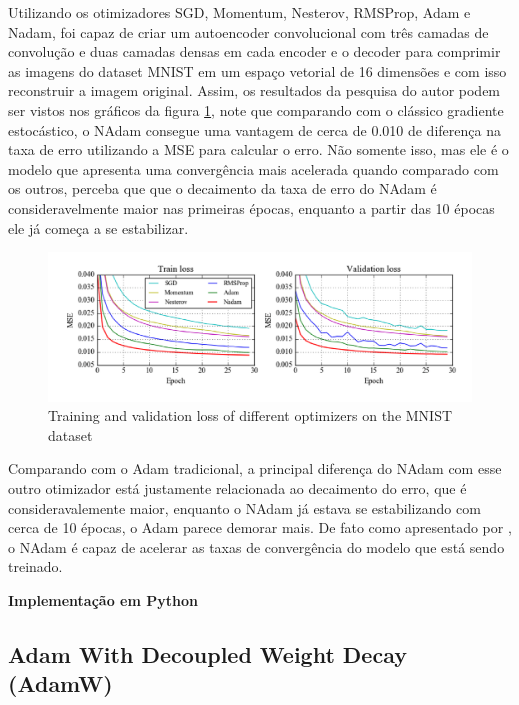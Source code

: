 Utilizando os otimizadores SGD, Momentum, Nesterov, RMSProp, Adam e Nadam, \textcite{NadamMethod} foi capaz de criar um autoencoder convolucional com três camadas de convolução e duas camadas densas em cada encoder e o decoder para comprimir as imagens do dataset MNIST em um espaço vetorial de 16 dimensões e com isso reconstruir a imagem original. Assim, os resultados da pesquisa do autor podem ser vistos nos gráficos da figura \ref{fig:comparativo-nadam-mnist}, note que comparando com o clássico gradiente estocástico, o NAdam consegue uma vantagem de cerca de 0.010 de diferença na taxa de erro utilizando a MSE para calcular o erro. Não somente isso, mas ele é o modelo que apresenta uma convergência mais acelerada quando comparado com os outros, perceba que que o decaimento da taxa de erro do NAdam é consideravelmente maior nas primeiras épocas, enquanto a partir das 10 épocas ele já começa a se estabilizar.

\begin{figure}[h]
    \centering
    \includegraphics[width=1\linewidth]{../imagens/retropropagacao-gradiente/comparativo-nadam-mnist.png}
    \caption{Training and validation loss of different optimizers on the MNIST dataset}
    \label{fig:comparativo-nadam-mnist}
\end{figure}
 
Comparando com o Adam tradicional, a principal diferença do NAdam com esse outro otimizador está justamente relacionada ao decaimento do erro, que é consideravalemente maior, enquanto o NAdam já estava se estabilizando com cerca de 10 épocas, o Adam parece demorar mais. De fato como apresentado por \textcite{NadamMethod}, o NAdam é capaz de acelerar as taxas de convergência do modelo que está sendo treinado.

\textbf{Implementação em Python}

\subsection{Adam With Decoupled Weight Decay (AdamW)}

